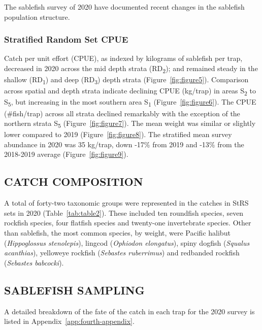 \documentclass[12pt]{article}\usepackage[]{graphicx}\usepackage[]{color}
\begin{document}
The sablefish survey of 2020 have documented recent changes in the sablefish population structure.

\hypertarget{stratified-random-set-cpue}{%
\subsubsection{Stratified Random Set CPUE}\label{stratified-random-set-cpue}}

Catch per unit effort (CPUE), as indexed by kilograms of sablefish per trap, decreased in 2020 across the mid depth strata (RD\textsubscript{2}); and remained steady in the shallow (RD\textsubscript{1}) and deep (RD\textsubscript{3}) depth strata (Figure~\ref{fig:figure5}). Comparison across spatial and depth strata indicate declining CPUE (kg/trap) in areas S\textsubscript{2} to S\textsubscript{5}, but increasing in the most southern area S\textsubscript{1} (Figure~\ref{fig:figure6}). The CPUE (\#fish/trap) across all strata declined remarkably with the exception of the northern strata S\textsubscript{5} (Figure~\ref{fig:figure7}). The mean weight was similar or slightly lower compared to 2019 (Figure~\ref{fig:figure8}). The stratified mean survey abundance in 2020 was 35 kg/trap, down -17\% from 2019 and -13\% from the 2018-2019 average (Figure~\ref{fig:figure9}).

\hypertarget{catch-composition}{%
\subsection{CATCH COMPOSITION}\label{catch-composition}}

A total of forty-two taxonomic groups were represented in the catches in StRS sets in 2020 (Table~\ref{tab:table2}). These included ten roundfish species, seven rockfish species, four flatfish species and twenty-one invertebrate species. Other than sablefish, the most common species, by weight, were Pacific halibut (\emph{Hippoglossus stenolepis}), lingcod (\emph{Ophiodon elongatus}), spiny dogfish (\emph{Squalus acanthias}), yelloweye rockfish (\emph{Sebastes ruberrimus}) and redbanded rockfish (\emph{Sebastes babcocki}).

\hypertarget{sablefish-sampling}{%
\subsection{SABLEFISH SAMPLING}\label{sablefish-sampling}}

A detailed breakdown of the fate of the catch in each trap for the 2020 survey is listed in Appendix~\ref{app:fourth-appendix}.
\end{document}
